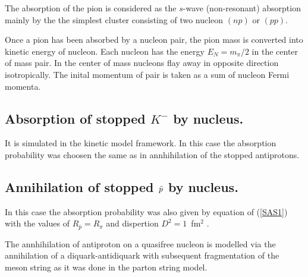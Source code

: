 The absorption of the  pion is considered as the $s$-wave (non-resonant) 
absorption mainly by the the simplest cluster consisting of two nucleon 
$(np)$ or $(pp)$. 

Once a pion has been absorbed by a nucleon pair, the pion mass is converted
into kinetic energy of nucleon. Each nucleon has the energy $E_N = m_{\pi}/2$ 
in the center of mass pair. In the center of mass nucleons flay away in
opposite direction isotropically.
The inital momentum of pair is taken as a sum of nucleon Fermi momenta.

\subsection{Absorption of stopped $K^{-}$ by nucleus.}
\hspace{1.0em} It is simulated in the kinetic model framework.
In this case the absorption probability was choosen the same as in
annhihilation of the stopped antiprotons.

\subsection{Annihilation of stopped $\protect\bar{p}$ by nucleus.}
In this case the absorption probability was also given by equation of 
(\ref{SAS1}) with the values of $R_{\bar{p}} = R_{\pi}$ and dispertion $D^2 = 
1$\ fm$^2$ \cite{INC82}.

The annhihilation of antiproton on a quasifree nucleon is modelled via the
annihilation of a diquark-antidiquark with subsequent fragmentation of the 
meson string as it was done in the parton string model. 
